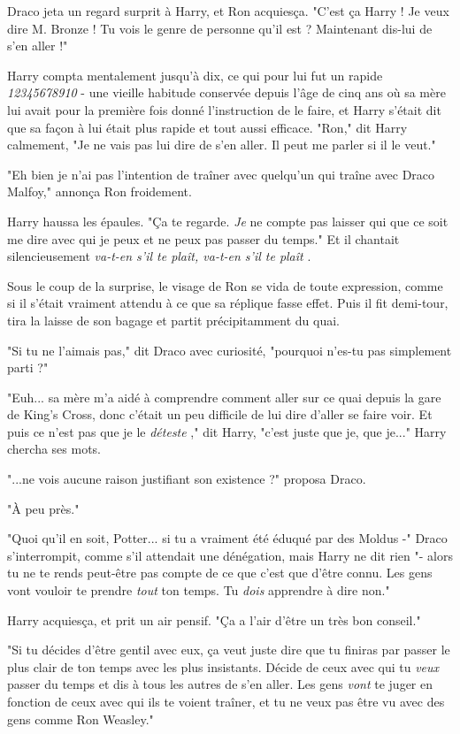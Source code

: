Draco jeta un regard surprit à Harry, et Ron acquiesça. "C'est ça Harry ! Je veux dire M. Bronze ! Tu vois le genre de personne qu'il est ? Maintenant dis-lui de s'en aller !"

Harry compta mentalement jusqu'à dix, ce qui pour lui fut un rapide \emph{12345678910}  - une vieille habitude conservée depuis l'âge de cinq ans où sa mère lui avait pour la première fois donné l'instruction de le faire, et Harry s'était dit que sa façon à lui était plus rapide et tout aussi efficace. "Ron," dit Harry calmement, "Je ne vais pas lui dire de s'en aller. Il peut me parler si il le veut."

"Eh bien je n'ai pas l'intention de traîner avec quelqu'un qui traîne avec Draco Malfoy," annonça Ron froidement.

Harry haussa les épaules. "Ça te regarde. \emph{Je}  ne compte pas laisser qui que ce soit me dire avec qui je peux et ne peux pas passer du temps." Et il chantait silencieusement \emph{va-t-en s'il te plaît, va-t-en s'il te plaît} .

Sous le coup de la surprise, le visage de Ron se vida de toute expression, comme si il s'était vraiment attendu à ce que sa réplique fasse effet. Puis il fit demi-tour, tira la laisse de son bagage et partit précipitamment du quai.

"Si tu ne l'aimais pas," dit Draco avec curiosité, "pourquoi n'es-tu pas simplement parti ?"

"Euh... sa mère m'a aidé à comprendre comment aller sur ce quai depuis la gare de King's Cross, donc c'était un peu difficile de lui dire d'aller se faire voir. Et puis ce n'est pas que je le \emph{déteste} ," dit Harry, "c'est juste que je, que je..." Harry chercha ses mots.

"...ne vois aucune raison justifiant son existence ?" proposa Draco.

"À peu près."

"Quoi qu'il en soit, Potter... si tu a vraiment été éduqué par des Moldus -" Draco s'interrompit, comme s'il attendait une dénégation, mais Harry ne dit rien "- alors tu ne te rends peut-être pas compte de ce que c'est que d'être connu. Les gens vont vouloir te prendre \emph{tout}  ton temps. Tu \emph{dois}  apprendre à dire non."

Harry acquiesça, et prit un air pensif. "Ça a l'air d'être un très bon conseil."

"Si tu décides d'être gentil avec eux, ça veut juste dire que tu finiras par passer le plus clair de ton temps avec les plus insistants. Décide de ceux avec qui tu \emph{veux}  passer du temps et dis à tous les autres de s'en aller. Les gens \emph{vont}  te juger en fonction de ceux avec qui ils te voient traîner, et tu ne veux pas être vu avec des gens comme Ron Weasley."

